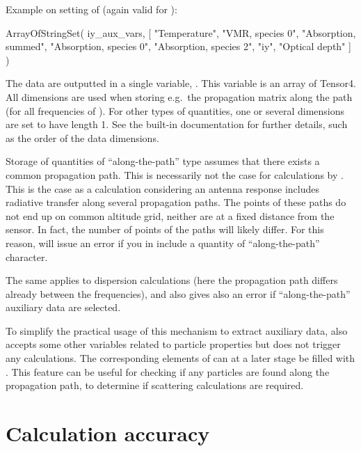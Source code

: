 Example on setting of  (again valid for
):
\begin{code}
ArrayOfStringSet( iy_aux_vars,  
    [ "Temperature", 
      "VMR, species 0",
      "Absorption, summed", 
      "Absorption, species 0",
      "Absorption, species 2",
      "iy", 
      "Optical depth" ] )
\end{code}
The data are outputted in a single variable, . This variable
is an array of Tensor4. All dimensions are used when storing e.g.\ the
propagation matrix along the path (for all frequencies of
). For other types of quantities, one or several dimensions
are set to have length 1. See the built-in documentation for further details,
such as the order of the data dimensions.

Storage of quantities of ``along-the-path'' type assumes that there exists a
common propagation path. This is necessarily not the case for calculations by
. This is the case as a calculation considering an antenna
response includes radiative transfer along several propagation paths. The
points of these paths do not end up on common altitude grid, neither are at a
fixed distance from the sensor. In fact, the number of points of the paths will
likely differ. For this reason,  will issue an error if you
in  include a quantity of ``along-the-path'' character.

The same applies to dispersion calculations (here the propagation path differs
already between the frequencies), and also  gives
also an error if ``along-the-path'' auxiliary data are selected.

To simplify the practical usage of this mechanism to extract auxiliary data,
 also accepts some other variables related to
particle properties but does not trigger any calculations. The corresponding
elements of  can at a later stage be filled with
. This feature can be useful for
checking if any particles are found along the propagation path, to determine if
scattering calculations are required.



\section{Calculation accuracy}
\label{sec:fm_defs:accuracy}

